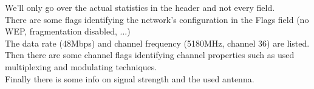 We'll only go over the actual statistics in the header and not every field. \\
There are some flags identifying the network's configuration in the Flags field (no WEP, fragmentation disabled, ...)\\
The data rate (48Mbps) and channel frequency (5180MHz, channel 36) are listed. \\
Then there are some channel flags identifying channel properties such as used multiplexing and modulating techniques. \\
Finally there is some info on signal strength and the used antenna.

